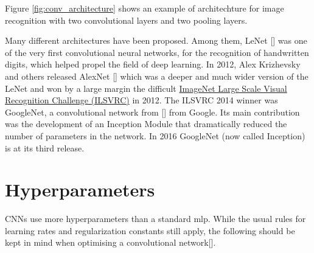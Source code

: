 Figure \ref{fig:conv_architecture} shows an example of architechture for image recognition with two convolutional layers and two pooling layers.

Many different architectures have been proposed. Among them, LeNet [\cite{lecun-98}] was one of the very first convolutional neural networks, for the recognition of handwritten digits, which helped propel the field of deep learning. In 2012, Alex Krizhevsky and others released AlexNet [\cite{krizhevsky2012imagenet}] which was a deeper and much wider version of the LeNet and won by a large margin the difficult \href{http://image-net.org/challenges/LSVRC/2012/index}{ImageNet Large Scale Visual Recognition Challenge (ILSVRC)} in 2012. The ILSVRC 2014 winner was GoogleNet, a convolutional network from [\cite{DBLP:journals/corr/SzegedyLJSRAEVR14}] from Google. Its main contribution was the development of an Inception Module that dramatically reduced the number of parameters in the network. In 2016 GoogleNet (now called Inception) is at its third release.

\section{Hyperparameters}


\acp{CNN} use more hyperparameters than a standard \ac{mlp}. While the usual rules for learning rates and regularization constants still apply, the following should be kept in mind when optimising a convolutional network[\cite{}].

